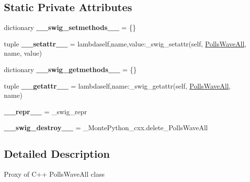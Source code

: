 \subsection*{Static Private Attributes}
\begin{DoxyCompactItemize}
\item 
\hypertarget{classMontePython__cxx_1_1PollsWaveAll_ad8a1b2a6426b166482b7bb2ef130e89b}{}dictionary {\bfseries \+\_\+\+\_\+swig\+\_\+setmethods\+\_\+\+\_\+} = \{\}\label{classMontePython__cxx_1_1PollsWaveAll_ad8a1b2a6426b166482b7bb2ef130e89b}

\item 
\hypertarget{classMontePython__cxx_1_1PollsWaveAll_acf17878d1cc0adc18c49c0ad0f4170b0}{}tuple {\bfseries \+\_\+\+\_\+setattr\+\_\+\+\_\+} = lambdaself,name,value\+:\+\_\+swig\+\_\+setattr(self, \hyperlink{classMontePython__cxx_1_1PollsWaveAll}{Polls\+Wave\+All}, name, value)\label{classMontePython__cxx_1_1PollsWaveAll_acf17878d1cc0adc18c49c0ad0f4170b0}

\item 
\hypertarget{classMontePython__cxx_1_1PollsWaveAll_a6ccd16cfbf3e2c3913fe45cd236c6a22}{}dictionary {\bfseries \+\_\+\+\_\+swig\+\_\+getmethods\+\_\+\+\_\+} = \{\}\label{classMontePython__cxx_1_1PollsWaveAll_a6ccd16cfbf3e2c3913fe45cd236c6a22}

\item 
\hypertarget{classMontePython__cxx_1_1PollsWaveAll_a33fff05ef21cd1689e754c3b4a9953a3}{}tuple {\bfseries \+\_\+\+\_\+getattr\+\_\+\+\_\+} = lambdaself,name\+:\+\_\+swig\+\_\+getattr(self, \hyperlink{classMontePython__cxx_1_1PollsWaveAll}{Polls\+Wave\+All}, name)\label{classMontePython__cxx_1_1PollsWaveAll_a33fff05ef21cd1689e754c3b4a9953a3}

\item 
\hypertarget{classMontePython__cxx_1_1PollsWaveAll_a299967f58b78ccfaf35959f8774cfdcc}{}{\bfseries \+\_\+\+\_\+repr\+\_\+\+\_\+} = \+\_\+swig\+\_\+repr\label{classMontePython__cxx_1_1PollsWaveAll_a299967f58b78ccfaf35959f8774cfdcc}

\item 
\hypertarget{classMontePython__cxx_1_1PollsWaveAll_aaebe7d40723abee7de59984560077f0c}{}{\bfseries \+\_\+\+\_\+swig\+\_\+destroy\+\_\+\+\_\+} = \+\_\+\+Monte\+Python\+\_\+cxx.\+delete\+\_\+\+Polls\+Wave\+All\label{classMontePython__cxx_1_1PollsWaveAll_aaebe7d40723abee7de59984560077f0c}

\end{DoxyCompactItemize}


\subsection{Detailed Description}
\begin{DoxyVerb}Proxy of C++ PollsWaveAll class\end{DoxyVerb}
 

